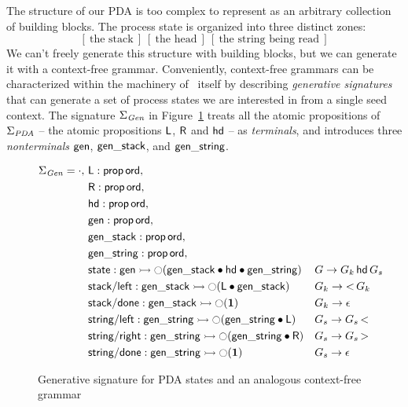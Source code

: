The structure of our PDA is too complex to represent as an arbitrary
collection of building blocks. The process state is organized into
three distinct zones:
\[
[~\mbox{the stack}~]
~
[~\mbox{the head}~]
~
[~\mbox{the string being read}~]
\]
We can't freely generate this structure with building blocks, but
we can generate it with a context-free grammar. 
Conveniently, context-free
grammars can be characterized within the
machinery of \sls~itself by describing {\it generative signatures}
that can generate a set of process states we are interested in from
a single seed context.  The signature $\Sigma_{\it Gen}$ in
Figure~\ref{fig:pda-gen} treats all the atomic propositions of
$\Sigma_{\it PDA}$ -- the atomic propositions ${\sf L}$, ${\sf R}$ and
${\sf hd}$ -- as {\it terminals}, and introduces three {\it
  nonterminals} ${\sf gen}$, ${\sf gen\_stack}$, and ${\sf
  gen\_string}$.

\begin{figure}
\begin{align*}
 \Sigma_{\it Gen} = \cdot, 
~&{\sf L} : {\sf prop}\,{\sf ord},\\
~&{\sf R} : {\sf prop}\,{\sf ord},\\
~&{\sf hd} : {\sf prop}\,{\sf ord},\\
~&{\sf gen} : {\sf prop}\,{\sf ord},\\
~&{\sf gen\_stack} : {\sf prop}\,{\sf ord},\\
~&{\sf gen\_string} : {\sf prop}\,{\sf ord},\\
~&{\sf state} : {\sf gen} 
       \rightarrowtail {\ocircle}({\sf gen\_stack} \mathbin{\bullet} {\sf hd} 
                         \mathbin{\bullet} {\sf gen\_string})
&& G \rightarrow G_k\,{\sf hd}\,G_s\\
~&{\sf stack/left} : {\sf gen\_stack} 
       \rightarrowtail {\ocircle}({\sf L} \mathbin{\bullet} {\sf gen\_stack})
&& G_k \rightarrow {\sf <}\,G_k \\
~&{\sf stack/done} : {\sf gen\_stack} \rightarrowtail {\ocircle}(\mathbf{1})
&& G_k \rightarrow \epsilon\\
~&{\sf string/left} : 
     {\sf gen\_string} 
       \rightarrowtail {\ocircle}({\sf gen\_string} \mathbin{\bullet} {\sf L})
&& G_s \rightarrow G_s\,{\sf <}\\
~&{\sf string/right} : 
     {\sf gen\_string} 
       \rightarrowtail {\ocircle}({\sf gen\_string} \mathbin{\bullet} {\sf R})
&& G_s \rightarrow G_s\,{\sf >}\\
~&{\sf string/done} : 
     {\sf gen\_string} 
       \rightarrowtail {\ocircle}(\mathbf{1})
&& G_s \rightarrow \epsilon
\end{align*}
\caption{Generative signature for PDA states and an analogous
  context-free grammar}
\label{fig:pda-gen}
\end{figure}

